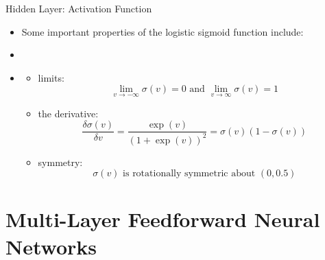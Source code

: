 \documentclass[11pt,compress,t,notes=noshow]{beamer}
\begin{document}
\begin{frame}{Hidden Layer: Activation Function}
  \begin{itemize}
    \item Some important properties of the logistic sigmoid function include:
    \item[]
    \item[]
    \begin{itemize}
      \item limits: $$\lim_{v \to -\infty} \sigma(v) = 0 \text{ and } \lim_{v \to \infty} \sigma(v) = 1$$
      \item the derivative: $$\frac{\delta\sigma(v)}{\delta v}=\frac{\exp(v)}{(1+\exp(v))^2} = \sigma(v)(1-\sigma(v))$$
      \item symmetry: $$\sigma(v) \text{ is rotationally symmetric about } (0, 0.5)$$ 
    \end{itemize}
  \end{itemize}
\end{frame}


\section{Multi-Layer Feedforward Neural Networks}
\end{document}
